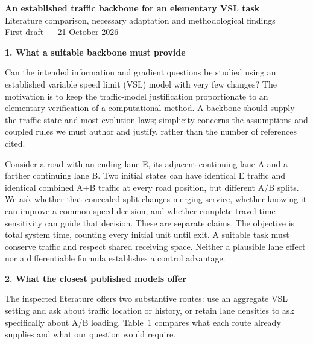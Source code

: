 \documentclass[10pt,a4paper]{article}
\newcommand{\head}[1]{\par\vspace{5pt}\noindent\textbf{#1}\par\nobreak\vspace{1pt}}
\begin{document}
\begin{center}
{\large\bfseries An established traffic backbone for an elementary VSL task}\\[3pt]
Literature comparison, necessary adaptation and methodological findings\\[2pt]
First draft --- 21 October 2026
\end{center}
\vspace{-3pt}

\head{1. What a suitable backbone must provide}
Can the intended information and gradient questions be studied using an
established variable speed limit (VSL) model with very few changes? The
motivation is to keep
the traffic-model justification proportionate to an elementary verification
of a computational method. A backbone should supply the traffic state and
most evolution laws; simplicity concerns the assumptions and coupled rules
we must author and justify, rather than the number of references cited.

Consider a road with an ending lane E, its adjacent continuing lane A and a
farther continuing lane B. Two initial states can have identical E traffic
and identical combined A+B traffic at every road position, but different
A/B splits. We ask whether that concealed split changes merging service,
whether knowing it can improve a common speed decision, and whether complete
travel-time sensitivity can guide that decision. These are separate claims.
The objective is total system time, counting every initial unit until exit.
A suitable task must conserve traffic and respect shared receiving space.
Neither a plausible lane effect nor a differentiable formula establishes a
control advantage.

\head{2. What the closest published models offer}
The inspected literature offers two substantive routes: use an aggregate
VSL setting and ask about traffic location or history, or retain lane
densities to ask specifically about A/B loading. Table~1 compares what each
route already supplies and what our question would require.
\end{document}
